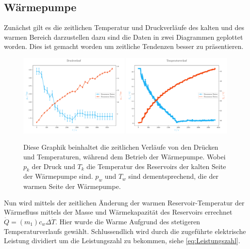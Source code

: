 \documentclass[12pt,english,ngerman]{scrartcl}
\begin{document}
\subsection{Wärmepumpe}

Zunächst gilt es die zeitlichen Temperatur und Druckverläufe des kalten und des
warmen Bereich darzustellen dazu sind die Daten in zwei Diagrammen geplottet
worden. Dies ist gemacht worden um zeitliche Tendenzen besser zu präsentieren.

\begin{figure}[H]
	\centering
	\includegraphics[width=0.49\textwidth]{figures/pressureProfile.pdf}
	\includegraphics[width=0.49\textwidth]{figures/temperatureProfile.pdf}
	\caption{Diese Graphik beinhaltet die zeitlichen Verläufe von den Drücken
		und Temperaturen, während dem Betrieb der Wärmepumpe. Wobei $p_k$
		der Druck und $T_k$ die Temperatur des Reservoirs der kalten Seite der Wärmepumpe
		sind. $p_w$ und $T_w$ sind dementsprechend, die der warmen Seite der Wärmepumpe.
	}\label{fig:druckTemperaturVerlauf}
\end{figure}

Nun wird mittels der zeitlichen Änderung der warmen Reservoir-Temperatur der
Wärmefluss mittels der Masse und Wärmekapazität des Reservoirs errechnet
$\dot{Q}= (m_1) c_w \Delta \dot{T}$. Hier wurde die Warme Aufgrund des
stetigeren Temperaturverlaufs gewählt. Schlussendlich wird durch die zugeführte
elektrische Leistung dividiert um die Leistungszahl zu bekommen, siehe
\autoref{eq:Leistungszahl}.
\end{document}
